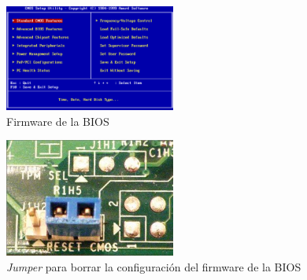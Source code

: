 \documentclass[12pt,spanish]{article}
\begin{document}
\begin{figure}[H]
	\centering
	\includegraphics[width=0.5\textwidth]{bios.png}
	\caption{Firmware de la BIOS}
\end{figure}

\begin{figure}[H]
	\centering
	\includegraphics[width=0.5\textwidth]{jumper.jpg}
	\caption{\textit{Jumper} para borrar la configuración del firmware de la BIOS}
\end{figure}
\end{document}
